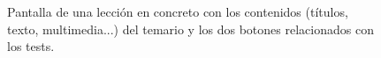 \begin{figure}[H]%
  \centering
  \qquad
  \caption{Pantalla de una lección en concreto con los contenidos (títulos, texto, multimedia...) del temario y los dos botones relacionados con los tests.}%
  \label{fig:example}%
\end{figure}




